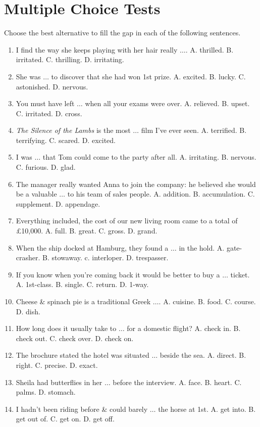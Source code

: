 \documentclass{article}
\numberwithin{equation}{section}
\begin{document}
\section{Multiple Choice Tests}
Choose the best alternative to fill the gap in each of the following sentences.
\begin{enumerate}[leftmargin=5mm]
	\item I find the way she keeps playing with her hair really $\ldots$. A. thrilled. B. irritated. C. thrilling. D. irritating.
	\item She was $\ldots$ to discover that she had won 1st prize. A. excited. B. lucky. C. astonished. D. nervous.
	\item You must have left $\ldots$ when all your exams were over. A. relieved. B. upset. C. irritated. D. cross.
	\item \textit{The Silence of the Lambs} is the most $\ldots$ film I've ever seen. A. terrified. B. terrifying. C. scared. D. excited.
	\item I was $\ldots$ that Tom could come to the party after all. A. irritating. B. nervous. C. furious. D. glad.
	\item The manager really wanted Anna to join the company: he believed she would be a valuable $\ldots$ to his team of sales people. A. addition. B. accumulation. C. supplement. D. appendage.
	\item Everything included, the cost of our new living room came to a total of \pounds10,000. A. full. B. great. C. gross. D. grand.
	\item When the ship docked at Hamburg, they found a $\ldots$ in the hold. A. gate-crasher. B. stowaway. c. interloper. D. trespasser.
	\item If you know when you're coming back it would be better to buy a $\ldots$ ticket. A. 1st-class. B. single. C. return. D. 1-way.
	\item Cheese \& spinach pie is a traditional Greek $\ldots$. A. cuisine. B. food. C. course. D. dish.
	\item How long does it usually take to $\ldots$ for a domestic flight? A. check in. B. check out. C. check over. D. check on.
	\item The brochure stated the hotel was situated $\ldots$ beside the sea. A. direct. B. right. C. precise. D. exact.
	\item Sheila had butterflies in her $\ldots$ before the interview. A. face. B. heart. C. palms. D. stomach.
	\item I hadn't been riding before \& could barely $\ldots$ the horse at 1st. A. get into. B. get out of. C. get on. D. get off.

\end{enumerate}
\end{document}
